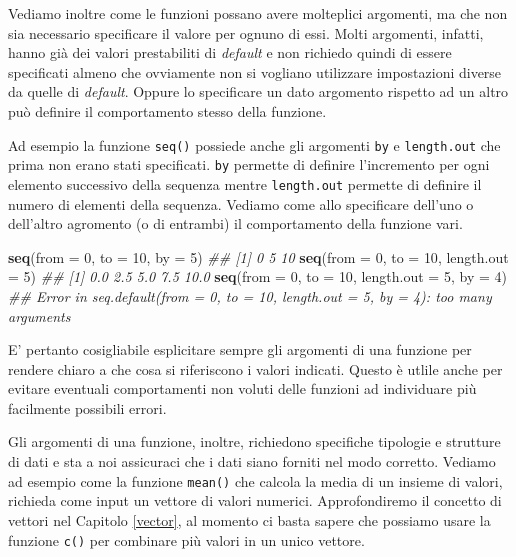 \documentclass[
]{book}
\newenvironment{Shaded}{\begin{snugshade}}{\end{snugshade}}
\newcommand{\CommentTok}[1]{\textcolor[rgb]{0.56,0.35,0.01}{\textit{#1}}}
\newcommand{\DataTypeTok}[1]{\textcolor[rgb]{0.13,0.29,0.53}{#1}}
\newcommand{\DecValTok}[1]{\textcolor[rgb]{0.00,0.00,0.81}{#1}}
\newcommand{\KeywordTok}[1]{\textcolor[rgb]{0.13,0.29,0.53}{\textbf{#1}}}
\newcommand{\NormalTok}[1]{#1}
\begin{document}
Vediamo inoltre come le funzioni possano avere molteplici argomenti, ma che non sia necessario specificare il valore per ognuno di essi. Molti argomenti, infatti, hanno già dei valori prestabiliti di \emph{default} e non richiedo quindi di essere specificati almeno che ovviamente non si vogliano utilizzare impostazioni diverse da quelle di \emph{default}. Oppure lo specificare un dato argomento rispetto ad un altro può definire il comportamento stesso della funzione.

Ad esempio la funzione \texttt{seq()} possiede anche gli argomenti \texttt{by} e \texttt{length.out} che prima non erano stati specificati. \texttt{by} permette di definire l'incremento per ogni elemento successivo della sequenza mentre \texttt{length.out} permette di definire il numero di elementi della sequenza. Vediamo come allo specificare dell'uno o dell'altro agromento (o di entrambi) il comportamento della funzione vari.

\begin{Shaded}
\begin{Highlighting}[]
\KeywordTok{seq}\NormalTok{(}\DataTypeTok{from =} \DecValTok{0}\NormalTok{,  }\DataTypeTok{to =} \DecValTok{10}\NormalTok{, }\DataTypeTok{by =} \DecValTok{5}\NormalTok{)}
\CommentTok{## [1]  0  5 10}
\KeywordTok{seq}\NormalTok{(}\DataTypeTok{from =} \DecValTok{0}\NormalTok{,  }\DataTypeTok{to =} \DecValTok{10}\NormalTok{, }\DataTypeTok{length.out =} \DecValTok{5}\NormalTok{)}
\CommentTok{## [1]  0.0  2.5  5.0  7.5 10.0}
\KeywordTok{seq}\NormalTok{(}\DataTypeTok{from =} \DecValTok{0}\NormalTok{,  }\DataTypeTok{to =} \DecValTok{10}\NormalTok{, }\DataTypeTok{length.out =} \DecValTok{5}\NormalTok{, }\DataTypeTok{by =} \DecValTok{4}\NormalTok{)}
\CommentTok{## Error in seq.default(from = 0, to = 10, length.out = 5, by = 4): too many arguments}
\end{Highlighting}
\end{Shaded}

E' pertanto cosigliabile esplicitare sempre gli argomenti di una funzione per rendere chiaro a che cosa si riferiscono i valori indicati. Questo è utlile anche per evitare eventuali comportamenti non voluti delle funzioni ad individuare più facilmente possibili errori.

Gli argomenti di una funzione, inoltre, richiedono specifiche tipologie e strutture di dati e sta a noi assicuraci che i dati siano forniti nel modo corretto. Vediamo ad esempio come la funzione \texttt{mean()} che calcola la media di un insieme di valori, richieda come input un vettore di valori numerici. Approfondiremo il concetto di vettori nel Capitolo \ref{vector}, al momento ci basta sapere che possiamo usare la funzione \texttt{c()} per combinare più valori in un unico vettore.
\end{document}
